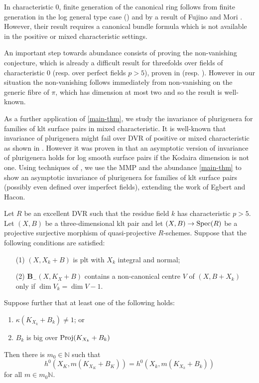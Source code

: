 	In characteristic $0$, finite generation of the canonical ring follows from finite generation in the log general type case (\cite{BCHM10}) and by a result of Fujino and Mori \cite[Theorem 5.2]{FM00}. However, their result requires a canonical bundle formula which is not available in the positive or mixed characteristic settings.

\begin{remark}
	An important step towards abundance consists of proving the non-vanishing conjecture, which is already a difficult result for threefolds over fields of characteristic $0$ (resp. over perfect fields $p>5$), proven in  \cite{FA} (resp. \cite{XZ19}).
	However in our situation the non-vanishing follows immediately from non-vanishing on the generic fibre of $\pi$, which has dimension at most two and so the result is well-known.
\end{remark}
	As a further application of \autoref{main-thm}, we study the invariance of plurigenera for families of klt surface pairs in mixed characteristic.
	It is well-known that invariance of plurigenera might fail over DVR of positive or mixed characteristic as shown in \cite{KU, Suh08, Bri20}.
	However it was proven in \cite{EH} that an asymptotic version of invariance of plurigenera holds for log smooth surface pairs if the Kodaira dimension is not one.
	Using techniques of \cite{HMX18}, we use the MMP and the abundance \autoref{main-thm} to show an asymptotic invariance of plurigenera for families of klt surface pairs (possibly even defined over imperfect fields), extending the work of Egbert and Hacon.
	
	\begin{theorem}\label{thm:ADIOP_final}
		Let $R$ be an excellent DVR such that the residue field $k$ has characteristic $p>5$.
		Let $(X,B)$ be a three-dimensional klt pair and let $(X,B)\to \operatorname{Spec}(R)$ be a projective surjective morphism of quasi-projective $R$-schemes.  Suppose that the following conditions are satisfied:
		
		\begin{enumerate}
		\item[(1)] $(X,X_{k}+B)$ is plt with $X_k$ integral and normal;
		\item[(2)] ${\mathbf{B}_{-}(X, K_{X}+B)}$ contains a non-canonical centre $V$ of $(X,B+X_{k})$ only if $\dim V_{k}=\dim V -1$.
		\end{enumerate}
		
		Suppose further that at least one of the following holds:
		\begin{enumerate}
			\item $\kappa(K_{X_{k}}+B_{k}) \neq 1$; or
			\item $B_{k}$ is big over $\textup{Proj}(K_{X_{k}}+B_{k})$
		\end{enumerate}	
		Then there is $m_{0} \in \mathbb{N}$ such that 
		$$h^{0}(X_{K},m(K_{X_{K}}+B_{K}))=h^{0}(X_{k},m(K_{X_{k}}+B_{k}))$$
		for all $m \in m_{0}\mathbb{N}$.
		
	\end{theorem}
	
